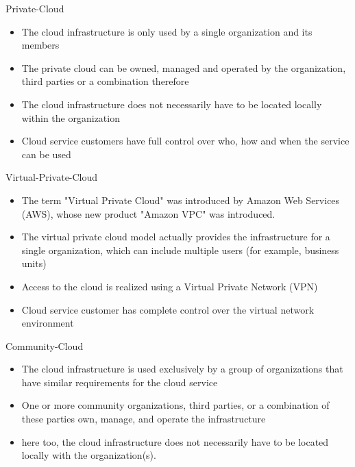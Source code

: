 \documentclass{article}
\begin{document}
Private-Cloud
\begin{itemize}
    \item The cloud infrastructure is only used by a single organization and its members
    \item The private cloud can be owned, managed and operated by the organization, third parties or a combination therefore
    \item The cloud infrastructure does not necessarily have to be located locally within the organization
    \item Cloud service customers have full control over who, how and when the service can be used
\end{itemize}
Virtual-Private-Cloud
\begin{itemize}
    \item The term "Virtual Private Cloud" was introduced by Amazon Web Services (AWS), whose new product "Amazon VPC" was introduced.
    \item The virtual private cloud model actually provides the infrastructure for a single organization, which can include multiple users (for example, business units)
    \item Access to the cloud is realized using a Virtual Private Network (VPN)
    \item Cloud service customer has complete control over the virtual network environment
\end{itemize}
Community-Cloud
\begin{itemize}
    \item The cloud infrastructure is used exclusively by a group of organizations that have similar requirements for the cloud service
    \item One or more community organizations, third parties, or a combination of these parties own, manage, and operate the infrastructure
    \item here too, the cloud infrastructure does not necessarily have to be located locally with the organization(s).
\end{itemize}
\end{document}
